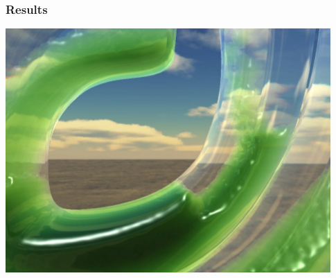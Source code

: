 \documentclass{beamer}
\begin{document}
	\begin{frame}[t]\frametitle{Results}
	    \includegraphics[scale=.5]{curveFlow.png}
	\end{frame}
\end{document}
